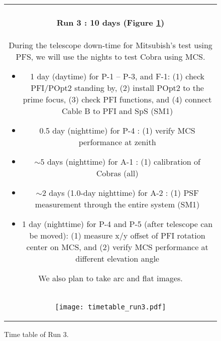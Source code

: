 \begin{figure}[!ht]
\begin{center}
\begin{tabular}{c}
\begin{minipage}{0.95\hsize}
\paragraph{Run 3 : 10 days  (Figure \ref{fig:run3})}
During the telescope down-time for Mitsubish's test using PFS, we will use the nights to test Cobra using MCS. 
	\begin{itemize}
	\item 1 day (daytime) for P-1 -- P-3,  and F-1:
	(1) check PFI/POpt2 standing by,
	(2) install POpt2 to the prime focus,
	(3) check PFI functions, and
	(4) connect Cable B to PFI and SpS (SM1)
	\item 0.5 day (nighttime) for P-4 :
	(1) verify  MCS performance at zenith
	\item $\sim 5$ days (nighttime) for A-1 :
	(1) calibration of Cobras (all)
	\item $\sim 2$ days (1.0-day nighttime) for A-2 : 
	(1) PSF measurement through the entire system (SM1)	
	\item 1 day (nighttime) for P-4 and P-5 (after telescope can be moved):
	(1) measure x/y offset of PFI rotation center on MCS, and
	(2) verify  MCS performance at different elevation angle
	\end{itemize}
We also plan to take arc and flat images.
\end{minipage} \\
\begin{minipage}{0.8\hsize}
	\begin{center}
	\vspace*{5mm}
	\texttt{[image: timetable\_run3.pdf]}
	\end{center}
	\vspace*{-5mm}
	\caption{Time table of Run 3.}
	\label{fig:run3}
\end{minipage}
\end{tabular}
\end{center}
\end{figure}



